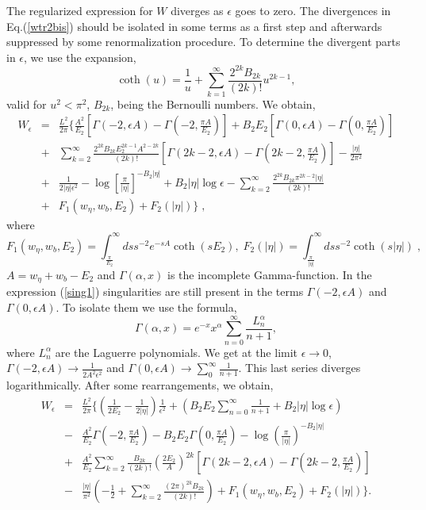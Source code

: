 \documentclass[a4paper,12pt]{article}
\newcommand{\n}{\eta}
\begin{document}
The regularized expression for $W$ diverges as $\epsilon$ goes to zero.  The
divergences in Eq.(\ref{wtr2bis}) should be isolated in some terms as
a first step and afterwards suppressed by some renormalization
procedure. To determine the divergent parts in $\epsilon$, we use the
expansion,
\begin{equation}
\coth(u)=\frac{1}{u}+\sum_{k=1}^{\infty}\frac{2^{2k}B_{2k}}{(2k)!}u^{2k-1}, 
\label{coth1}
\end{equation}
valid for $u^{2}<\pi^{2}$, $B_{2k}$, being the Bernoulli numbers.  We
obtain,
\begin{eqnarray}\label{sing1}
W_{\epsilon}&=& \frac{L^2}{2\pi}\{\frac{A^{2}}{E_{2}}\left[\Gamma(-2,\epsilon A)-\Gamma(-2,\frac{\pi A}{E_{2}})\right]
+B_{2}E_{2}\left[\Gamma(0,\epsilon A)-\Gamma(0,\frac{\pi  A}{E_{2}})\right] \nonumber\\
& + &  \sum_{k=2}^{\infty}\frac{2^{2k}B_{2k}E_{2}^{2k-1}A^{2-2k}}{(2k)!}
\left[\Gamma(2k-2,\epsilon A)-\Gamma(2k-2,\frac{\pi A}{E_{2}})\right]-\frac{|\n|}{2\pi^{2}} \nonumber\\ 
&+& \frac{1}{2|\n|\epsilon^{2}}-\log \left[ \frac{\pi}{|\n|}\right]^{-B_{2}|\n|}+B_{2}|\n|\log \epsilon
-\sum_{k=2}^{\infty}\frac{2^{2k}B_{2k}\pi^{2k-2}|\n|}{(2k)!} \nonumber\\
& +& F_{1}(w_{\n},w_{b},E_{2})+F_{2}(|\n|)\}\;, 
\end{eqnarray}
where
\begin{equation}
F_{1}(w_{\n},w_{b},E_{2})=\int_\frac{\pi}{E_{2}}^\infty dss^{-2}e^{-sA}\coth(sE_{2}) , \;  
F_{2}(|\n|)=\int_\frac{\pi}{|\n|}^\infty ds s^{-2}\coth(s|\n|)\;,
\label{F1F2}
\end{equation}
$A= w_{\n}+w_{b}-E_{2}$ and $\Gamma(\alpha,x)$ is the incomplete Gamma-function.
%
In the expression (\ref{sing1}) singularities are still present in the
terms $\Gamma(-2,\epsilon A)$ and $\Gamma(0,\epsilon A)$. To isolate them we use the formula,
\begin{equation}
\Gamma(\alpha,x)=e^{-x}x^{\alpha}\sum_{n=0}^{\infty}\frac{L_{n}^{\alpha}}{n+1},
\label{laguerre}
\end{equation}
where $L_{n}^{\alpha}$ are the Laguerre polynomials. We get at the limit $\epsilon
\to 0$, $\Gamma(-2,\epsilon A)\to \frac{1}{2A^{2}\epsilon^{2}}$ and $\Gamma(0,\epsilon A)\to \sum_{0}^{\infty}
\frac{1}{n+1}$. This last series diverges logarithmically.
%
After some rearrangements, we obtain,
\begin{eqnarray}
\label{sing2}
W_{\epsilon}&=& \frac{L^2}{2\pi}\{(\frac{1}{2E_{2}}-\frac{1}{2|\n|})\frac{1}{\epsilon^{2}}+ 
(B_{2}E_{2}\sum_{n=0}^{\infty}\frac{1}{n+1}+B_{2}|\n|\log \epsilon) \nonumber\\
&-& \frac{A^{2}}{E_{2}}\Gamma(-2,\frac{\pi A}{E_{2}})-B_{2}E_{2}\Gamma(0,\frac{\pi A}{E_{2}})- 
\log(\frac{\pi}{|\n|})^{-B_{2}|\n|} \nonumber \\ 
&+& \frac{A^{2}}{E_{2}}\sum_{k=2}^{\infty}\frac{B_{2k}}{(2k)!}(\frac{2E_{2}}{A})^{2k}
\left[\Gamma(2k-2,\epsilon A)-\Gamma(2k-2, \frac{\pi A}{E_{2}})\right] \nonumber \\
&-& \frac{|\n|}{\pi^{2}}(-\frac{1}{2}+\sum_{k=2}^{\infty}
\frac{(2\pi)^{2k}B_{2k}}{(2k)!})+F_{1}(w_{\n},w_{b},E_{2})+F_{2}(|\n|)\}.\nonumber \\
\end{eqnarray}
\end{document}
